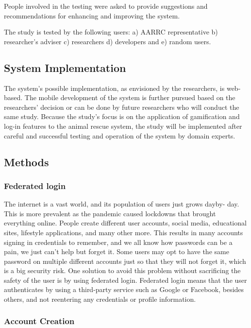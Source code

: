 People involved in the testing were asked to provide suggestions and recommendations
for enhancing and improving the system.

The study is tested by the following users: a) AARRC representative b) researcher’s
adviser c) researchers d) developers and e) random users.

\subsection{System Implementation}

The system’s possible implementation, as envisioned by the researchers, is
web-based. The mobile development of the system is further pursued based on
the researchers’ decision or can be done by future researchers who will conduct the
same study. Because the study’s focus is on the application of gamification and
log-in features to the animal rescue system, the study will be implemented after
careful and successful testing and operation of the system by domain experts.

\subsection{Methods}
\subsubsection{Federated login}

The internet is a vast world, and its population of users just grows dayby-
day. This is more prevalent as the pandemic caused lockdowns that brought
everything online. People create different user accounts, social media, educational
sites, lifestyle applications, and many other more. This results in many accounts
signing in credentials to remember, and we all know how passwords can be a
pain, we just can’t help but forget it. Some users may opt to have the same
password on multiple different accounts just so that they will not forget it, which
is a big security risk. One solution to avoid this problem without sacrificing the
safety of the user is by using federated login. Federated login means that the user
authenticates by using a third-party service such as Google or Facebook, besides
others, and not reentering any credentials or profile information.

\subsubsection{Account Creation}

